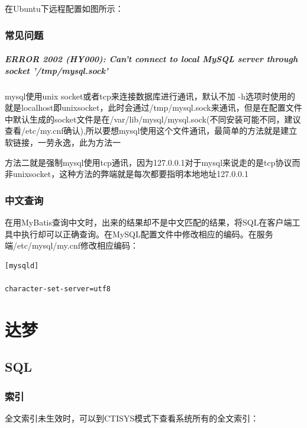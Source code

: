 \documentclass[letter]{book}
\begin{document}
在Ubuntu下远程配置如图\label{raspberryremtoeconfig}所示：

\subsection{常见问题}

\paragraph{ERROR 2002 (HY000): Can't connect to local MySQL server through socket '/tmp/mysql.sock'}

mysql使用unix socket或者tcp来连接数据库进行通讯，默认不加 -h选项时使用的就是localhost即unixsocket，此时会通过/tmp/mysql.sock来通讯，但是在配置文件中默认生成的socket文件是在/var/lib/mysql/mysql.sock(不同安装可能不同，建议查看/etc/my.cnf确认),所以要想mysql使用这个文件通讯，最简单的方法就是建立软链接，一劳永逸，此为方法一

方法二就是强制mysql使用tcp通讯，因为127.0.0.1对于mysql来说走的是tcp协议而非unixsocket，这种方法的弊端就是每次都要指明本地地址127.0.0.1

\subsection{中文查询}

在用MyBatis查询中文时，出来的结果却不是中文匹配的结果，将SQL在客户端工具中执行却可以正确查询。在MySQL配置文件中修改相应的编码。在服务端/etc/mysql/my.cnf修改相应编码：

\begin{lstlisting}[language=Bash]
[mysqld]

character-set-server=utf8
\end{lstlisting}




\chapter{达梦}

\section{SQL}

\subsection{索引}

全文索引未生效时，可以到CTISYS模式下查看系统所有的全文索引：
\end{document}
